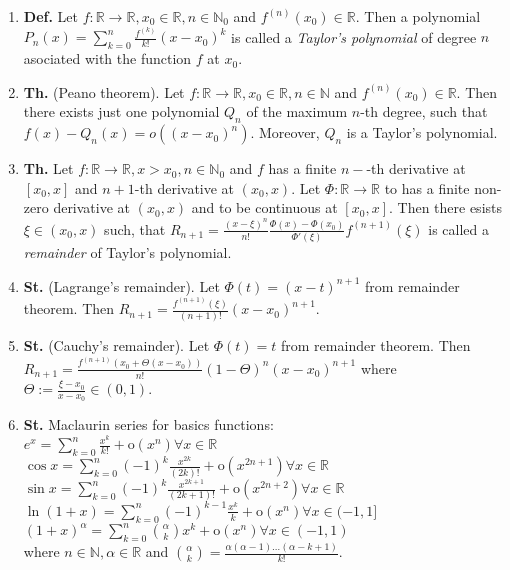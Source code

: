 \documentclass{article}
\newcommand{\<}{\left<}
\renewcommand{\>}{\right>}
\renewcommand{\o}{\text{o}}
\newcommand{\N}{\mathbb{N}}
\newcommand{\R}{\mathbb{R}}
\newcommand{\define}{\textbf{Def. }}
\newcommand{\state}{\textbf{St. }}
\newcommand{\theor}{\textbf{Th. }}
\begin{document}
\begin{multicols}{3}
\begin{enumerate}[itemsep=2pt, topsep=2pt, partopsep=2pt, parsep=2pt]
        \item \define Let $f:\R\to\R,x_0\in\R,n\in\N_0$ and $f^{(n)}(x_0)\in\R$. Then a polynomial $P_n(x)=\sum_{k=0}^n\frac{f^{(k)}}{k!}(x-x_0)^k$ is called a \emph{Taylor's polynomial} of degree $n$ asociated with the function $f$ at $x_0$.
        \item \theor (Peano theorem). Let $f:\R\to\R,x_0\in\R,n\in\N$  and $f^{(n)}(x_0)\in\R$. Then there exists just one polynomial $Q_n$ of the maximum $n$-th degree, such that $f(x)-Q_n(x)=o((x-x_0)^n)$. Moreover, $Q_n$ is a Taylor's polynomial.
        \item \theor Let $f:\R\to\R,x>x_0,n\in\N_0$ and $f$ has a finite $n-$-th derivative at $[x_0,x]$ and $n+1$-th derivative at $(x_0,x)$. Let $\Phi:\R\to\R$ to has a finite non-zero derivative at $(x_0,x)$ and to be continuous at $[x_0,x]$. Then there esists $\xi\in(x_0,x)$ such, that $R_{n+1}=\frac{(x-\xi)^n}{n!}\frac{\Phi(x)-\Phi(x_0)}{\Phi'(\xi)}f^{(n+1)}(\xi)$ is called a \emph{remainder} of Taylor's polynomial.\\
        \item \state (Lagrange's remainder). Let $\Phi(t)=(x-t)^{n+1}$ from remainder theorem. Then $R_{n+1}=\frac{f^{(n+1)}(\xi)}{(n+1)!}(x-x_0)^{n+1}$.
        \item \state (Cauchy's remainder). Let $\Phi(t)=t$ from remainder theorem. Then $R_{n+1}=\frac{f^{(n+1)}(x_0+\Theta(x-x_0))}{n!}(1-\Theta)^n(x-x_0)^{n+1}$ where $\Theta:=\frac{\xi-x_0}{x-x_0}\in(0,1)$.
        \item \state Maclaurin series for basics functions:\\
        $e^x=\sum_{k=0}^n\frac{x^k}{k!}+\o(x^n)$\hfill$\forall x\in\R\;\qquad$\\
        $\cos x=\sum_{k=0}^n(-1)^k\frac{x^{2k}}{(2k)!}+\o(x^{2n+1})$\hfill$\forall x\in\R\;\qquad$\\
        $\sin x=\sum_{k=0}^n(-1)^k\frac{x^{2k+1}}{(2k+1)!}+\o(x^{2n+2})$\hfill$\forall x\in\R\;\qquad$\\
        $\ln(1+x)=\sum_{k=0}^n(-1)^{k-1}\frac{x^k}{k}+\o(x^n)$\hfill$\forall x\in(-1,1]$\\
        $(1+x)^\alpha=\sum_{k=0}^n{\alpha\choose k}x^k+\o(x^n)$\hfill$\forall x\in(-1,1)$\\
        where $n\in\N,\alpha\in\R$ and ${\alpha\choose k}=\frac{\alpha(\alpha-1)\ldots(\alpha-k+1)}{k!}$.


\end{enumerate}
\end{multicols}
\end{document}
